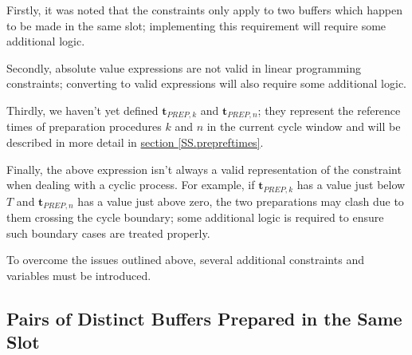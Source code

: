 Firstly, it was noted that the constraints only apply to two buffers which
happen to be made in the same slot; implementing this requirement will require
some additional logic.

Secondly, absolute value expressions are not valid in linear programming
constraints; converting to valid expressions will also require some additional
logic.

Thirdly, we haven't yet defined $\boldsymbol{t}_{\mathit{PREP},k}$ and 
$\boldsymbol{t}_{\mathit{PREP},n}$; they represent the reference times of
preparation procedures $k$ and $n$ in the current cycle window and will be
described in more detail in 
\hyperref[SS.prepreftimes]{section \ref*{SS.prepreftimes}}.

Finally, the above expression isn't always a valid representation of the
constraint when dealing with a cyclic process.
For example, if $\boldsymbol{t}_{\mathit{PREP},k}$ has a value just below $T$
and $\boldsymbol{t}_{\mathit{PREP},n}$ has a value just above zero, the two
preparations may clash due to them crossing the cycle boundary; some additional
logic is required to ensure such boundary cases are treated properly.

To overcome the issues outlined above, several additional constraints and
variables must be introduced.

\subsection{Pairs of Distinct Buffers Prepared in the Same Slot}
\label{SS.constr6}

